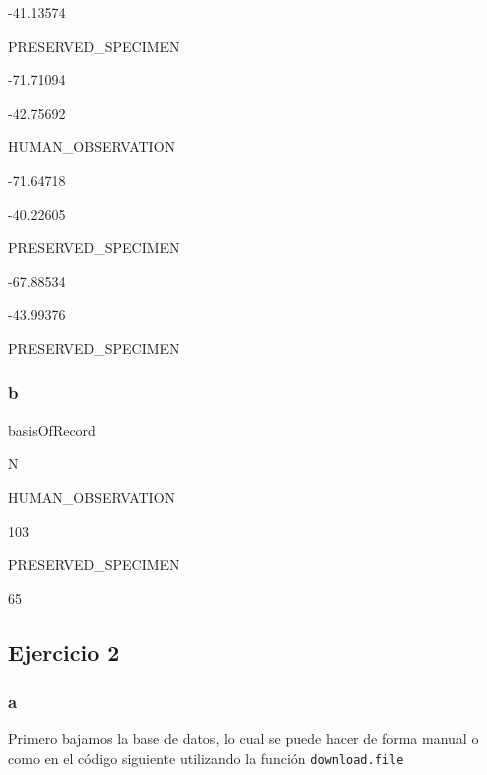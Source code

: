 \documentclass[]{book}
\newenvironment{Shaded}{\begin{snugshade}}{\end{snugshade}}
\newcommand{\DataTypeTok}[1]{\textcolor[rgb]{0.13,0.29,0.53}{#1}}
\newcommand{\KeywordTok}[1]{\textcolor[rgb]{0.13,0.29,0.53}{\textbf{#1}}}
\newcommand{\NormalTok}[1]{#1}
\newcommand{\OperatorTok}[1]{\textcolor[rgb]{0.81,0.36,0.00}{\textbf{#1}}}
\newcommand{\StringTok}[1]{\textcolor[rgb]{0.31,0.60,0.02}{#1}}
\begin{document}
-41.13574

PRESERVED\_SPECIMEN

-71.71094

-42.75692

HUMAN\_OBSERVATION

-71.64718

-40.22605

PRESERVED\_SPECIMEN

-67.88534

-43.99376

PRESERVED\_SPECIMEN

\hypertarget{b}{%
\subsubsection{b}\label{b}}

\begin{Shaded}
\end{Shaded}

basisOfRecord

N

HUMAN\_OBSERVATION

103

PRESERVED\_SPECIMEN

65

\hypertarget{ejercicio-2-3}{%
\subsection{Ejercicio 2}\label{ejercicio-2-3}}

\hypertarget{a-1}{%
\subsubsection{a}\label{a-1}}

Primero bajamos la base de datos, lo cual se puede hacer de forma manual
o como en el código siguiente utilizando la función
\texttt{download.file}

\begin{Shaded}
\end{Shaded}
\end{document}

